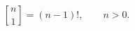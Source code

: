 \newcommand\stiring[2]{\genfrac{[}{]}{0pt}{}{#1}{#2}}
\newcommand\dstiring[2]{\genfrac{[}{]}{0pt}{0}{#1}{#2}}
\newcommand\tstiring[2]{\genfrac{[}{]}{0pt}{1}{#1}{#2}}
\[  \stiring{n}{1} = (n-1)!, \qquad n > 0.  \]
